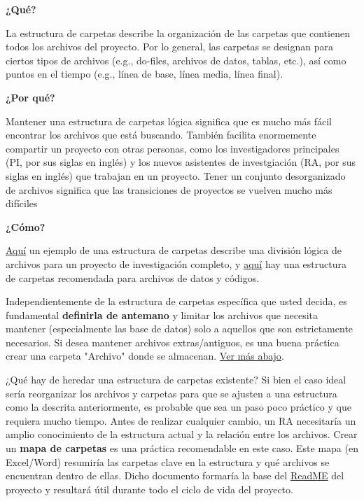 \documentclass[11pt,en]{elegantpaper}
\begin{document}
\textbf{¿Qué?}

La estructura de carpetas describe la organización de las carpetas que contienen todos los archivos del proyecto. Por lo general, las carpetas se designan para ciertos tipos de archivos (e.g., do-files, archivos de datos, tablas, etc.), así como puntos en el tiempo (e.g., línea de base, línea media, línea final).

\textbf{¿Por qué?} 

Mantener una estructura de carpetas lógica significa que es mucho más fácil encontrar los archivos que está buscando. También facilita enormemente compartir un proyecto con otras personas, como los investigadores principales (PI, por sus siglas en inglés) y los nuevos asistentes de investgiación (RA, por sus siglas en inglés) que trabajan en un proyecto. Tener un conjunto desorganizado de archivos significa que las transiciones de proyectos se vuelven mucho más difíciles


\textbf{¿Cómo?}

\hyperref[fig:carpetas]{Aquí} un ejemplo de una estructura de carpetas describe una división lógica de archivos para un proyecto de investigación completo, y \hyperref[fig:code]{aquí} hay una estructura de carpetas recomendada para archivos de datos y códigos. 

Independientemente de la estructura de carpetas específica que usted decida, es fundamental \textbf{definirla de antemano} y limitar los archivos que necesita mantener (especialmente las base de datos) solo a aquellos que son estrictamente necesarios. Si desea mantener archivos extras/antiguos, es una buena práctica crear una carpeta "Archivo" donde se almacenan. \hyperref[sec:doorganizar]{Ver más abajo}.

¿Qué hay de heredar una estructura de carpetas existente? Si bien el caso ideal sería reorganizar los archivos y carpetas para que se ajusten a una estructura como la descrita anteriormente, es probable que sea un paso poco práctico y que requiera mucho tiempo. Antes de realizar cualquier cambio, un RA necesitaría un amplio conocimiento de la estructura actual y la relación entre los archivos. Crear un \textbf{mapa de carpetas} es una práctica recomendable en este caso. Este mapa (en Excel/Word) resumiría las carpetas clave en la estructura y qué archivos se encuentran dentro de ellas. Dicho documento formaría la base del \href{http://www.poverty-action.org/research-transparency/example-readme-files}{ReadME} del proyecto y resultará útil durante todo el ciclo de vida del proyecto.
\end{document}
